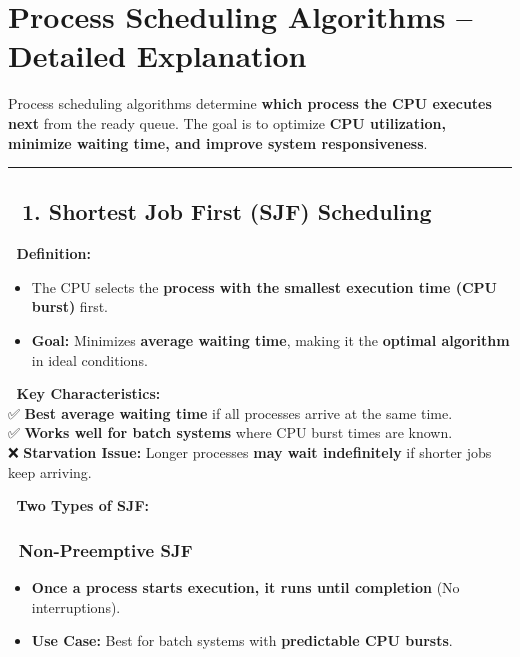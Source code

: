 \documentclass[
]{article}
\providecommand{\tightlist}{%
  \setlength{\itemsep}{0pt}\setlength{\parskip}{0pt}}
\begin{document}
\section{\texorpdfstring{\textbf{Process Scheduling Algorithms --
Detailed
Explanation}}{Process Scheduling Algorithms -- Detailed Explanation}}\label{process-scheduling-algorithms-detailed-explanation}

Process scheduling algorithms determine \textbf{which process the CPU
executes next} from the ready queue. The goal is to optimize \textbf{CPU
utilization, minimize waiting time, and improve system responsiveness}.

\begin{center}\rule{0.5\linewidth}{0.5pt}\end{center}

\subsection{\texorpdfstring{\textbf{📌 1. Shortest Job First (SJF)
Scheduling}}{📌 1. Shortest Job First (SJF) Scheduling}}\label{shortest-job-first-sjf-scheduling}

📌 \textbf{Definition:}

\begin{itemize}
\tightlist
\item
  The CPU selects the \textbf{process with the smallest execution time
  (CPU burst)} first.
\item
  \textbf{Goal:} Minimizes \textbf{average waiting time}, making it the
  \textbf{optimal algorithm} in ideal conditions.
\end{itemize}

📌 \textbf{Key Characteristics:}\\
✅ \textbf{Best average waiting time} if all processes arrive at the
same time.\\
✅ \textbf{Works well for batch systems} where CPU burst times are
known.\\
❌ \textbf{Starvation Issue:} Longer processes \textbf{may wait
indefinitely} if shorter jobs keep arriving.

📌 \textbf{Two Types of SJF:}

\subsubsection{\texorpdfstring{\textbf{🔹 Non-Preemptive
SJF}}{🔹 Non-Preemptive SJF}}\label{non-preemptive-sjf}

\begin{itemize}
\tightlist
\item
  \textbf{Once a process starts execution, it runs until completion} (No
  interruptions).
\item
  \textbf{Use Case:} Best for batch systems with \textbf{predictable CPU
  bursts}.
\end{itemize}
\end{document}
